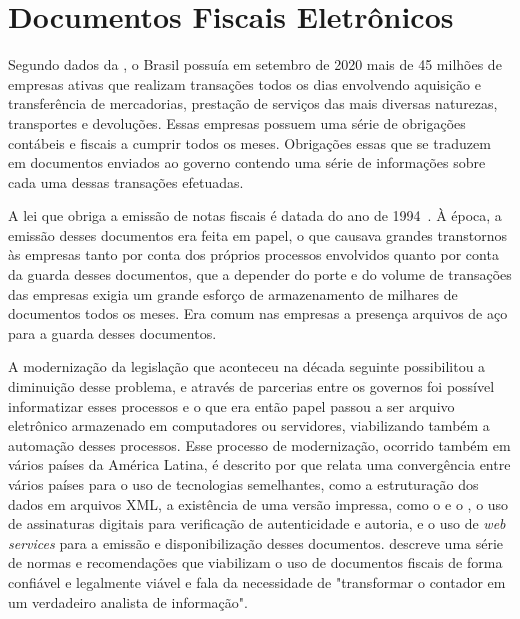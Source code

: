 \newcommand{\comando}[1]{\textbf{$\backslash$#1}}

\section{Documentos Fiscais Eletrônicos}
\label{introducao:dfe}

Segundo dados da , o Brasil possuía em setembro de 2020 mais de 45 milhões de empresas ativas que realizam transações todos os dias envolvendo aquisição e transferência de mercadorias, prestação de serviços das mais diversas naturezas, transportes e devoluções. Essas empresas possuem uma série de obrigações contábeis e fiscais a cumprir todos os meses. Obrigações essas que se traduzem em documentos enviados ao governo contendo uma série de informações sobre cada uma dessas transações efetuadas.

A lei que obriga a emissão de notas fiscais é datada do ano de 1994~\cite{lei:8846:documentos-fiscais}. À época, a emissão desses documentos era feita em papel, o que causava grandes transtornos às empresas tanto por conta dos próprios processos envolvidos quanto por conta da guarda desses documentos, que a depender do porte e do volume de transações das empresas exigia um grande esforço de armazenamento de milhares de documentos todos os meses. Era comum nas empresas a presença arquivos de aço para a guarda desses documentos.

A modernização da legislação que aconteceu na década seguinte possibilitou a diminuição desse problema, e através de parcerias entre os governos foi possível informatizar esses processos e o que era então papel passou a ser arquivo eletrônico armazenado em computadores ou servidores, viabilizando também a automação desses processos. Esse processo de modernização, ocorrido também em vários países da América Latina, é descrito por  que relata uma convergência entre vários países para o uso de tecnologias semelhantes, como a estruturação dos dados em arquivos XML, a existência de uma versão impressa, como o  e o , o uso de assinaturas digitais para verificação de autenticidade e autoria, e o uso de \textit{web services} para a emissão e disponibilização desses documentos.  descreve uma série de normas e recomendações que viabilizam o uso de documentos fiscais de forma confiável e legalmente viável e fala da necessidade de "transformar o contador em um verdadeiro analista de informação".

